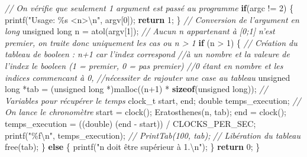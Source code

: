 \documentclass[
    ]{article}
\newenvironment{Shaded}{}{}
\newcommand{\CommentTok}[1]{\textcolor[rgb]{0.38,0.63,0.69}{\textit{#1}}}
\newcommand{\ControlFlowTok}[1]{\textcolor[rgb]{0.00,0.44,0.13}{\textbf{#1}}}
\newcommand{\DataTypeTok}[1]{\textcolor[rgb]{0.56,0.13,0.00}{#1}}
\newcommand{\DecValTok}[1]{\textcolor[rgb]{0.25,0.63,0.44}{#1}}
\newcommand{\KeywordTok}[1]{\textcolor[rgb]{0.00,0.44,0.13}{\textbf{#1}}}
\newcommand{\NormalTok}[1]{#1}
\newcommand{\SpecialCharTok}[1]{\textcolor[rgb]{0.25,0.44,0.63}{#1}}
\newcommand{\StringTok}[1]{\textcolor[rgb]{0.25,0.44,0.63}{#1}}
\begin{document}
\begin{Shaded}
\begin{Highlighting}[]
    \CommentTok{   // On vérifie que seulement 1 argument est passé au programme}
    \ControlFlowTok{if}\NormalTok{(argc != }\DecValTok{2}\NormalTok{) \{}
\NormalTok{        printf(}\StringTok{"Usage: \%s \textless{}n\textgreater{}}\SpecialCharTok{\textbackslash{}n}\StringTok{"}\NormalTok{, argv[}\DecValTok{0}\NormalTok{]);}
        \ControlFlowTok{return} \DecValTok{1}\NormalTok{;}
\NormalTok{    \}}
    \CommentTok{    // Conversion de l'argument en long}
    \DataTypeTok{unsigned} \DataTypeTok{long}\NormalTok{ n = atol(argv[}\DecValTok{1}\NormalTok{]);}
    \CommentTok{   // Aucun n appartenant à [0;1] n'est premier, on traite donc uniquement les cas ou n > 1}
    \ControlFlowTok{if}\NormalTok{ (n \textgreater{} }\DecValTok{1}\NormalTok{) \{}
        \CommentTok{ // Création du tableau de booleen : n+1 car l'index correspond }
        \CommentTok{ //à un nombre et la valeure de l'index le booleen (1 = premier, 0 = pas premier)}
        \CommentTok{ //0 étant en nombre et les indices commencant à 0, }
        \CommentTok{ //nécessiter de rajouter une case au tableau}
    \DataTypeTok{unsigned} \DataTypeTok{long}\NormalTok{ *tab = (}\DataTypeTok{unsigned} \DataTypeTok{long}\NormalTok{ *)malloc((n+}\DecValTok{1}\NormalTok{) * }\KeywordTok{sizeof}\NormalTok{(}\DataTypeTok{unsigned} \DataTypeTok{long}\NormalTok{));}
    \CommentTok{        // Variables pour récupérer le temps}
\NormalTok{        clock\_t start, end;}
        \DataTypeTok{double}\NormalTok{ temps\_execution;}
        \CommentTok{// On lance le chronomètre}
\NormalTok{        start = clock();}
\NormalTok{        Eratosthenes(n, tab);}
\NormalTok{        end = clock();}
\NormalTok{        temps\_execution = ((}\DataTypeTok{double}\NormalTok{) (end {-} start)) / CLOCKS\_PER\_SEC;}
\NormalTok{        printf(}\StringTok{"\%f}\SpecialCharTok{\textbackslash{}n}\StringTok{"}\NormalTok{, temps\_execution);}
        \CommentTok{// PrintTab(100, tab);}
        \CommentTok{// Libération du tableau}
\NormalTok{        free(tab);}
\NormalTok{    \} }\ControlFlowTok{else}\NormalTok{ \{}
\NormalTok{        printf(}\StringTok{"n doit être supérieur à 1.}\SpecialCharTok{\textbackslash{}n}\StringTok{"}\NormalTok{);}
\NormalTok{    \}}
    \ControlFlowTok{return} \DecValTok{0}\NormalTok{;}
\NormalTok{\}}
\end{Highlighting}
\end{Shaded}
\pagebreak
\end{document}
